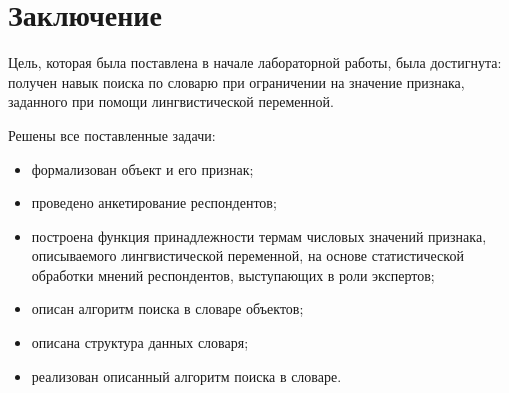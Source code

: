 \chapter*{Заключение}

Цель, которая была поставлена в начале лабораторной работы, была достигнута: получен навык поиска по словарю при ограничении на значение признака, заданного при помощи лингвистической переменной.

Решены все поставленные задачи:
\begin{itemize}[label=---]
	\item формализован объект и его признак;
	\item проведено анкетирование респондентов;
	\item построена функция принадлежности термам числовых значений признака, описываемого лингвистической переменной, на основе статистической обработки мнений респондентов, выступающих в роли экспертов;
	\item описан алгоритм поиска в словаре объектов;
	\item описана структура данных словаря;
	\item реализован описанный алгоритм поиска в словаре.
\end{itemize}